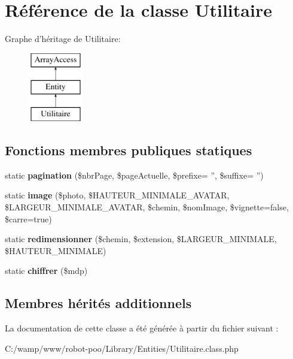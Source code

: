 \hypertarget{class_library_1_1_entities_1_1_utilitaire}{\section{Référence de la classe Utilitaire}
\label{class_library_1_1_entities_1_1_utilitaire}
}
Graphe d'héritage de Utilitaire\+:\begin{figure}[H]
\begin{center}
\leavevmode
\includegraphics[height=3.000000cm]{class_library_1_1_entities_1_1_utilitaire}
\end{center}
\end{figure}
\subsection*{Fonctions membres publiques statiques}
\begin{DoxyCompactItemize}
\item 
\hypertarget{class_library_1_1_entities_1_1_utilitaire_ac1d065ab725af24e9dc28e7c399da908}{static {\bfseries pagination} (\$nbr\+Page, \$page\+Actuelle, \$prefixe= '', \$suffixe= '')}\label{class_library_1_1_entities_1_1_utilitaire_ac1d065ab725af24e9dc28e7c399da908}

\item 
\hypertarget{class_library_1_1_entities_1_1_utilitaire_a84dd1628eb6a9b6eb2a6f2bfc398e134}{static {\bfseries image} (\$photo, \$H\+A\+U\+T\+E\+U\+R\+\_\+\+M\+I\+N\+I\+M\+A\+L\+E\+\_\+\+A\+V\+A\+T\+A\+R, \$L\+A\+R\+G\+E\+U\+R\+\_\+\+M\+I\+N\+I\+M\+A\+L\+E\+\_\+\+A\+V\+A\+T\+A\+R, \$chemin, \$nom\+Image, \$vignette=false, \$carre=true)}\label{class_library_1_1_entities_1_1_utilitaire_a84dd1628eb6a9b6eb2a6f2bfc398e134}

\item 
\hypertarget{class_library_1_1_entities_1_1_utilitaire_afa59cd28e5008250750fab345e6705ba}{static {\bfseries redimensionner} (\$chemin, \$extension, \$L\+A\+R\+G\+E\+U\+R\+\_\+\+M\+I\+N\+I\+M\+A\+L\+E, \$H\+A\+U\+T\+E\+U\+R\+\_\+\+M\+I\+N\+I\+M\+A\+L\+E)}\label{class_library_1_1_entities_1_1_utilitaire_afa59cd28e5008250750fab345e6705ba}

\item 
\hypertarget{class_library_1_1_entities_1_1_utilitaire_a6507860389719ba17d2af29396250380}{static {\bfseries chiffrer} (\$mdp)}\label{class_library_1_1_entities_1_1_utilitaire_a6507860389719ba17d2af29396250380}

\end{DoxyCompactItemize}
\subsection*{Membres hérités additionnels}


La documentation de cette classe a été générée à partir du fichier suivant \+:\begin{DoxyCompactItemize}
\item 
C\+:/wamp/www/robot-\/poo/\+Library/\+Entities/Utilitaire.\+class.\+php\end{DoxyCompactItemize}
